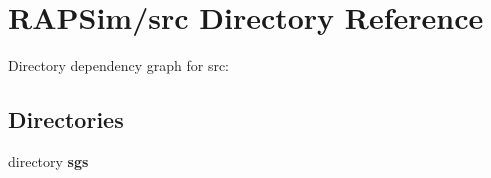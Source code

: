 \section{R\-A\-P\-Sim/src Directory Reference}
\label{dir_c674e5f991bd170a376e4567e3a9a4d5}
Directory dependency graph for src\-:
\subsection*{Directories}
\begin{DoxyCompactItemize}
\item 
directory {\bf sgs}
\end{DoxyCompactItemize}
